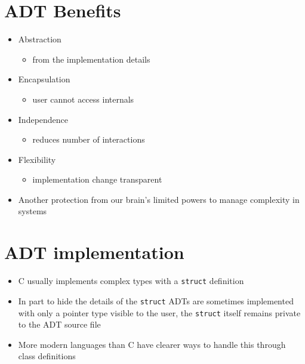 \documentclass{article}
\begin{document}
\section{ADT Benefits}
\begin{itemize}
\item Abstraction
\begin{itemize}
\item from the implementation details
\end{itemize}
\item Encapsulation
\begin{itemize}
\item user cannot access internals
\end{itemize}
\item Independence
\begin{itemize}
\item reduces number of interactions
\end{itemize}
\item Flexibility
\begin{itemize}
\item implementation change transparent
\end{itemize}
\item Another protection from our brain's limited powers to manage complexity in systems
\end{itemize}



\section{ADT implementation}
\begin{itemize}
\item C usually implements complex types with a \verb!struct! definition

\item In part to hide the details of the \verb!struct! ADTs are sometimes implemented with only a pointer type visible to the user, the \verb!struct! itself remains private to the ADT source file

\item More modern languages than C have clearer ways to handle this through class definitions
\end{itemize}
\end{document}
